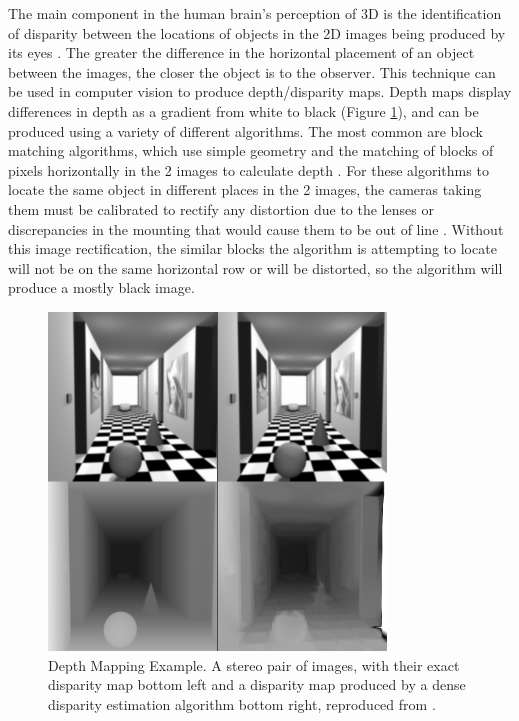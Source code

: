 The main component in the human brain's perception of 3D is the identification of disparity between the locations of objects in the 2D images being produced by its eyes \cite{qian1997binocular}. The greater the difference in the horizontal placement of an object between the images, the closer the object is to the observer. This technique can be used in computer vision to produce depth/disparity maps. Depth maps display differences in depth as a gradient from white to black (Figure \ref{fig:depthmap}), and can be produced using a variety of different algorithms. The most common are block matching algorithms, which use simple geometry and the matching of blocks of pixels horizontally in the 2 images to calculate depth \cite{linda2001stockman}. For these algorithms to locate the same object in different places in the 2 images, the cameras taking them must be calibrated to rectify any distortion due to the lenses \cite{distort} or discrepancies in the mounting that would cause them to be out of line \cite{stereocal}. Without this image rectification, the similar blocks the algorithm is attempting to locate will not be on the same horizontal row or will be distorted, so the algorithm will produce a mostly black image.

\begin{figure}[H]
    \begin{center}
      \includegraphics[width=0.8\textwidth]{Figures/depthmap.png}
      \caption[Depth Mapping Example]{Depth Mapping Example. A stereo pair of images, with their exact disparity map bottom left and a disparity map produced by a dense disparity estimation algorithm bottom right, reproduced from \cite{deptheg}.}
      \label{fig:depthmap}
    \end{center}
\end{figure}